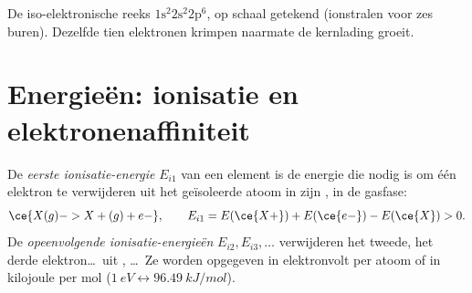 \begin{omfigure}

{\small De iso-elektronische reeks $1\text{s}^2 2\text{s}^2 2\text{p}^6$,
op schaal getekend (ionstralen voor zes buren). Dezelfde tien elektronen
krimpen naarmate de kernlading groeit.}
\end{omfigure}

\section{Energieën: ionisatie en elektronenaffiniteit}

\begin{definition}\label{def:b1:periodicity:ionisation-energy}
De \emph{eerste ionisatie-energie} $E_{i1}$
van een element is de energie die nodig is om één elektron te verwijderen
uit het geïsoleerde atoom in zijn , in de gasfase:
\[
  \ce{X(g) -> X+(g) + e-}, \qquad E_{i1} = E(\ce{X+}) + E(\ce{e-}) - E(\ce{X}) > 0 .
\]
De \emph{opeenvolgende ionisatie-energieën}
$E_{i2}, E_{i3}, \dots$ verwijderen het tweede, het derde
elektron\dots\ uit , \dots\ Ze worden opgegeven in
elektronvolt per atoom of in kilojoule per mol
($\qty{1}{eV} \leftrightarrow \qty{96.49}{kJ/mol}$).
\end{definition}

